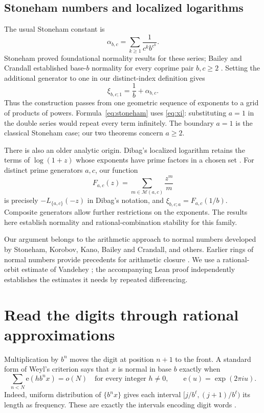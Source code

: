 \documentclass[11pt]{article}
\newcommand{\e}{\mathrm e}
\newcommand{\M}{\mathcal M}
\begin{document}
\subsection*{Stoneham numbers and localized logarithms}

The usual Stoneham constant is
\[
 \alpha_{b,c}=\sum_{k\ge1}\frac1{c^k b^{c^k}}.
\]
Stoneham proved foundational normality results for these series;
Bailey and Crandall established base-\(b\) normality for every coprime
pair \(b,c\ge2\) \cite{Stoneham,BaileyCrandall}. Setting the additional
generator to one in our distinct-index definition gives
\begin{equation}\label{eq:stoneham}
 \xi_{b,c;1}=\frac1b+\alpha_{b,c}.
\end{equation}
Thus the construction passes from one geometric sequence of exponents
to a grid of products of powers. Formula~\eqref{eq:stoneham} uses
\eqref{eq:xi}: substituting \(a=1\) in the double series would repeat
every term infinitely. The boundary \(a=1\) is the classical Stoneham
case; our two theorems concern \(a\ge2\).

There is also an older analytic origin. Dibag's localized logarithm
retains the terms of \(\log(1+z)\) whose exponents have prime factors
in a chosen set \cite[Definitions 1.1--1.2]{Dibag}. For distinct prime
generators \(a,c\), our function
\[
 F_{a,c}(z)=\sum_{m\in\M(a,c)}\frac{z^m}{m}
\]
is precisely \(-L_{\{a,c\}}(-z)\) in Dibag's notation, and
\(\xi_{b,c;a}=F_{a,c}(1/b)\). Composite generators allow further
restrictions on the exponents. The results here establish normality
and rational-combination stability for this family.

Our argument belongs to the arithmetic approach to normal numbers
developed by Stoneham, Korobov, Kano, Bailey and Crandall, and others.
Earlier rings of normal numbers provide precedents for arithmetic
closure \cite{Kano,KanoShiokawa}. We use a rational-orbit estimate of
Vandehey \cite{Vandehey}; the accompanying Lean proof independently
establishes the estimates it needs by repeated differencing.

\section{Read the digits through rational approximations}

Multiplication by \(b^n\) moves the digit at position \(n+1\) to the
front. A standard form of Weyl's criterion says that \(x\) is normal
in base \(b\) exactly when
\begin{equation}\label{eq:weyl}
 \sum_{n<N}\e(hb^n x)=o(N)
 \quad\text{for every integer \(h\ne0\)},\qquad
 \e(u)=\exp(2\pi i u).
\end{equation}
Indeed, uniform distribution of \(\{b^nx\}\) gives each interval
\([j/b^\ell,(j+1)/b^\ell)\) its length as frequency. These are exactly
the intervals encoding digit words \cite{Weyl}.
\end{document}
